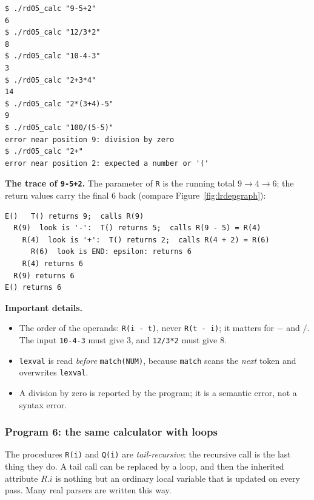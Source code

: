 \documentclass[11pt,a4paper]{article}
\begin{document}
\begin{lstlisting}[basicstyle=\ttfamily\footnotesize,tabsize=4]
$ ./rd05_calc "9-5+2"
6
$ ./rd05_calc "12/3*2"
8
$ ./rd05_calc "10-4-3"
3
$ ./rd05_calc "2+3*4"
14
$ ./rd05_calc "2*(3+4)-5"
9
$ ./rd05_calc "100/(5-5)"
error near position 9: division by zero
$ ./rd05_calc "2+"
error near position 2: expected a number or '('
\end{lstlisting}

\textbf{The trace of \texttt{9-5+2}.} The parameter of \texttt{R} is the running total $9\to4\to6$; the return values carry the final 6 back (compare Figure~\ref{fig:lrdepgraph}):
\begin{lstlisting}[basicstyle=\ttfamily\footnotesize]
E()   T() returns 9;  calls R(9)
  R(9)  look is '-':  T() returns 5;  calls R(9 - 5) = R(4)
    R(4)  look is '+':  T() returns 2;  calls R(4 + 2) = R(6)
      R(6)  look is END: epsilon: returns 6
    R(4) returns 6
  R(9) returns 6
E() returns 6
\end{lstlisting}
\textbf{Important details.}
\begin{itemize}[nosep]
\item The order of the operands: \texttt{R(i - t)}, never \texttt{R(t - i)}; it matters for $-$ and $/$. The input \texttt{10-4-3} must give $3$, and \texttt{12/3*2} must give $8$.
\item \texttt{lexval} is read \emph{before} \texttt{match(NUM)}, because \texttt{match} scans the \emph{next} token and overwrites \texttt{lexval}.
\item A division by zero is reported by the program; it is a semantic error, not a syntax error.
\end{itemize}

\subsubsection*{Program 6: the same calculator with loops}
The procedures \texttt{R(i)} and \texttt{Q(i)} are \emph{tail-recursive}: the recursive call is the last thing they do. A tail call can be replaced by a loop, and then the inherited attribute $R.i$ is nothing but an ordinary local variable that is updated on every pass. Many real parsers are written this way.
\end{document}

